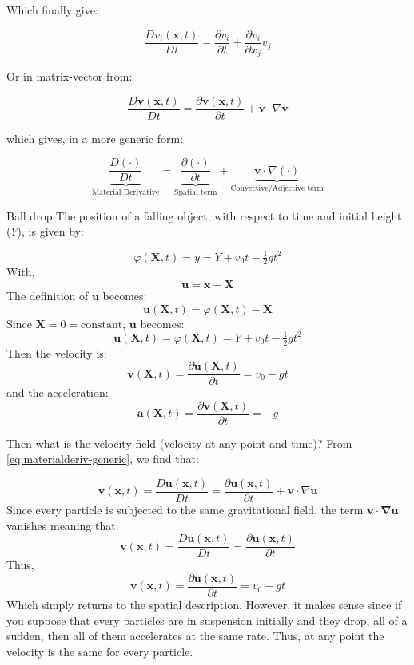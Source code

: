 Which finally give:

\begin{equation}
    \label{eq:materialderiv-final}
    \dfrac{Dv_i(\mathbf{x},t)}{Dt} = 
    \dfrac{\partial v_i}{\partial t} + \dfrac{\partial v_i}{\partial x_j}v_j
\end{equation}

Or in matrix-vector from:

\begin{equation}
    \label{eq:materialderiv-final2}
    \dfrac{D \mathbf{v}(\mathbf{x},t)}{Dt} = 
    \dfrac{\partial \mathbf{v}(\mathbf{x}, t)}{\partial t} + \mathbf{v} \cdot \nabla \mathbf{v}
\end{equation}


which gives, in a more generic form:

\begin{equation}
    \label{eq:materialderiv-generic}
    \underbrace{\dfrac{D(\cdot)}{Dt} }_{\text{Material Derivative}}=
    \underbrace{\dfrac{\partial (\cdot)}{\partial t}}_{\text{Spatial term}} + 
    \underbrace{\mathbf{v } \cdot \nabla (\cdot)}_{\text{Convective/Adjective term}}
\end{equation}

\begin{example}{Ball drop}
    The position of a falling object, with respect to time and initial height ($Y$), is given by:

    $$
        \varphi(\mathbf{X}, t) = y = Y + v_0t - \tfrac{1}{2}gt^2
    $$
    With,
    $$
        \mathbf{u = x - X} 
    $$
    The definition of $\mathbf{u}$ becomes:
    $$
        \mathbf{u}(\mathbf{X}, t) = \varphi(\mathbf{X}, t) - \mathbf{X} 
    $$
    Since $\mathbf{X}=0=\text{constant}$, $\mathbf{u}$ becomes:
    $$
        \mathbf{u}(\mathbf{X}, t) = \varphi(\mathbf{X}, t) = Y + v_0t - \tfrac{1}{2}gt^2
    $$
    Then the velocity is: 
    $$
        \mathbf{v}(\mathbf{X},t) = \dfrac{\partial \mathbf{u}(\mathbf{X}, t)}{\partial t} = v_0 -gt
    $$
    and the acceleration:
    $$
        \mathbf{a}(\mathbf{X},t) = \dfrac{\partial \mathbf{v}(\mathbf{X}, t)}{\partial t} = -g
    $$

    Then what is the velocity field (velocity at any point and time)? From \cref{eq:materialderiv-generic}, we find that:

    $$
    \mathbf{v}(\mathbf{x}, t) = \dfrac{D \mathbf{u}(\mathbf{x},t)}{Dt} = 
    \dfrac{\partial \mathbf{u}(\mathbf{x}, t)}{\partial t} + \mathbf{v} \cdot \nabla \mathbf{u}  
    $$
    Since every particle is subjected to the same gravitational field, the term $\mathbf{v \cdot \nabla u}$ vanishes meaning that:
    $$
    \mathbf{v}(\mathbf{x}, t) = \dfrac{D \mathbf{u}(\mathbf{x},t)}{Dt} = 
    \dfrac{\partial \mathbf{u}(\mathbf{x}, t)}{\partial t}
    $$
    Thus,
    $$
    \mathbf{v}(\mathbf{x}, t) = \dfrac{\partial \mathbf{u}(\mathbf{x}, t)}{\partial t} = v_0 - gt
    $$
    Which simply returns to the spatial description. However, it makes sense since if you suppose that every particles are in suspension initially and they drop, all of a sudden, then all of them accelerates at the same rate. Thus, at any point the velocity is the same for every particle.

    
\end{example}
